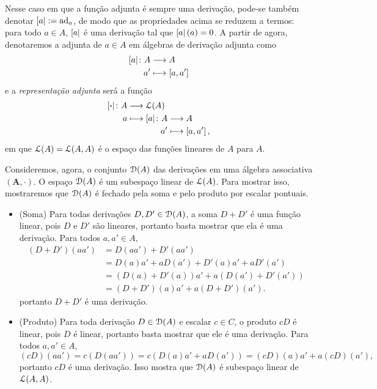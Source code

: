 Nesse caso em que a função adjunta é sempre uma derivação, pode-se também denotar $\left[{a}\right| := \operatorname{ad}_a$, de modo que as propriedades acima se reduzem a termos: para todo $a \in A$, $\left[{a}\right|$ é uma derivação tal que $\left[{a}\right|(a)=0$. A partir de agora, denotaremos a adjunta de $a \in A$ em álgebras de derivação adjunta como
	\begin{align*}
	{\left[{a}\right|}\colon {A} &\longrightarrow {A} \\{a'} &\longmapsto \left[{a},{a'}\right]
	\end{align*}
e a \emph{representação adjunta} será a função
	\begin{align*}
	\func{\ad{\var}}{A}{\lin(A)}{a}{
		\begin{aligned}[t]
		\func{\ad{a}}{A}{A}{a'}{\col{a}{a'}},
		\end{aligned}
	}
	\end{align*}
em que $\mathcal{L}(A) = \mathcal{L}(A,A)$ é o espaço das funções lineares de $A$ para $A$.

Consideremos, agora, o conjunto $\mathcal{D}(A)$ das derivações em uma álgebra associativa $(\bm A, \cdot)$. O espaço $\mathcal{D}(A)$ é um subespaço linear de $\mathcal{L}(A)$. Para mostrar isso, mostraremos que $\mathcal{D}(A)$ é fechado pela soma e pelo produto por escalar pontuais.
\begin{itemize}
\item (Soma) Para todas derivações $D,D' \in \mathcal{D}(A)$, a soma $D+D'$ é uma função linear, pois $D$ e $D'$ são lineares, portanto basta mostrar que ela é uma derivação. Para todos $a,a' \in A$,
	\begin{align*}
	(D+D')(aa') &= D(aa') + D'(aa') \\
		&= D(a)a' + aD(a') + D'(a)a' + aD'(a') \\
		&= (D(a)+D'(a))a' + a(D(a')+D'(a')) \\
		&= (D+D')(a)a' + a(D+D')(a').
	\end{align*}
portanto $D+D'$ é uma derivação.

\item (Produto) Para toda derivação $D \in \mathcal{D}(A)$ e escalar $c \in C$, o produto $cD$ é linear, pois $D$ é linear, portanto basta mostrar que ele é uma derivação. Para todos $a,a' \in A$,
	\begin{equation*}
	(cD)(aa') = c(D(aa')) = c(D(a)a' + aD(a')) = (cD)(a)a' + a(cD)(a'),
	\end{equation*}
portanto $cD$ é uma derivação. Isso mostra que $\mathcal{D}(A)$ é subespaço linear de $\mathcal{L}(A,A)$.
\end{itemize}


